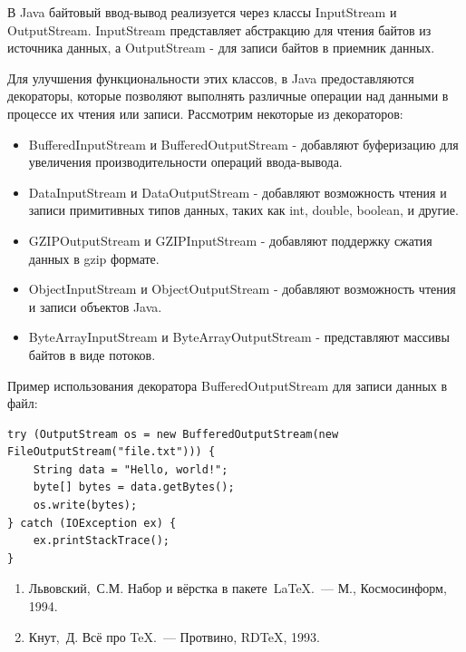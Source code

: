 В Java байтовый ввод-вывод реализуется через классы InputStream и OutputStream. InputStream представляет абстракцию для чтения байтов из источника данных, а OutputStream - для записи байтов в приемник данных.

Для улучшения функциональности этих классов, в Java предоставляются декораторы, которые позволяют выполнять различные операции над данными в процессе их чтения или записи. Рассмотрим некоторые из декораторов:

\begin{itemize}
\item BufferedInputStream и BufferedOutputStream - добавляют буферизацию для увеличения производительности операций ввода-вывода.
\item DataInputStream и DataOutputStream - добавляют возможность чтения и записи примитивных типов данных, таких как int, double, boolean, и другие.
\item GZIPOutputStream и GZIPInputStream - добавляют поддержку сжатия данных в gzip формате.
\item ObjectInputStream и ObjectOutputStream - добавляют возможность чтения и записи объектов Java.
\item ByteArrayInputStream и ByteArrayOutputStream - представляют массивы байтов в виде потоков.
\end{itemize}

Пример использования декоратора BufferedOutputStream для записи данных в файл:

\begin{lstlisting}
try (OutputStream os = new BufferedOutputStream(new FileOutputStream("file.txt"))) {
    String data = "Hello, world!";
    byte[] bytes = data.getBytes();
    os.write(bytes);
} catch (IOException ex) {
    ex.printStackTrace();
}

\end{lstlisting}

\begin{enumerate}%

\item\label{r8} Львовский,~С.М. Набор и вёрстка в пакете~\LaTeX.~---
М., Космосинформ, 1994.

\item\label{r1} Кнут,~Д. Всё про \TeX.~--- Протвино, RD\TeX, 1993.

\end{enumerate}%


\label{pages_total}%


